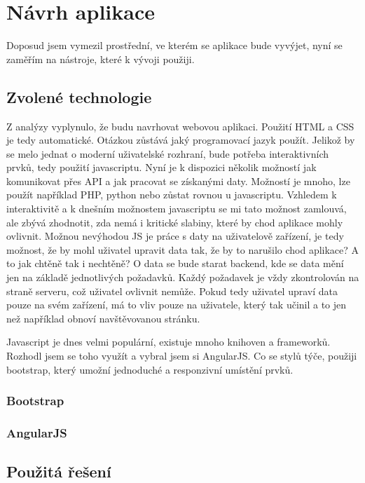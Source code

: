 \documentclass[thesis=B,czech]{FITthesis}[2012/06/26]
\begin{document}

\chapter{Návrh aplikace}
	Doposud jsem vymezil prostřední, ve kterém se aplikace bude vyvýjet, nyní se zaměřím na nástroje, které k vývoji použiji.


	\section{Zvolené technologie}
		Z analýzy vyplynulo, že budu navrhovat webovou aplikaci. Použití HTML a CSS je tedy automatické. Otázkou zůstává jaký programovací jazyk použít. Jelikož by se melo jednat o moderní uživatelské rozhraní, bude potřeba interaktivních prvků, tedy použití javascriptu. Nyní je k dispozici několik možností jak komunikovat přes API a jak pracovat se získanými daty. Možností je mnoho, lze použít například PHP, python nebo zůstat rovnou u javascriptu. Vzhledem k interaktivitě a k dnešním možnostem javascriptu se mi tato možnost zamlouvá, ale zbývá zhodnotit, zda nemá i kritické slabiny, které by chod aplikace mohly ovlivnit. Možnou nevýhodou JS je práce s daty na uživatelově zařízení, je tedy možnost, že by mohl uživatel upravit data tak, že by to narušilo chod aplikace? A to jak chtěně tak i nechtěně? O data se bude starat backend, kde se data mění jen na základě jednotlivých požadavků. Každý požadavek je vždy zkontrolován na straně serveru, což uživatel ovlivnit nemůže. Pokud tedy uživatel upraví data pouze na svém zařízení, má to vliv pouze na uživatele, který tak učinil a to jen než například obnoví navštěvovanou stránku.

		Javascript je dnes velmi populární, existuje mnoho knihoven a frameworků. Rozhodl jsem se toho využít a vybral jsem si AngularJS. Co se stylů týče, použiji bootstrap, který umožní jednoduché a responzivní umístění prvků.

		\subsection{Bootstrap}
		
		\subsection{AngularJS}

	\section{Použitá řešení}
\end{document}
